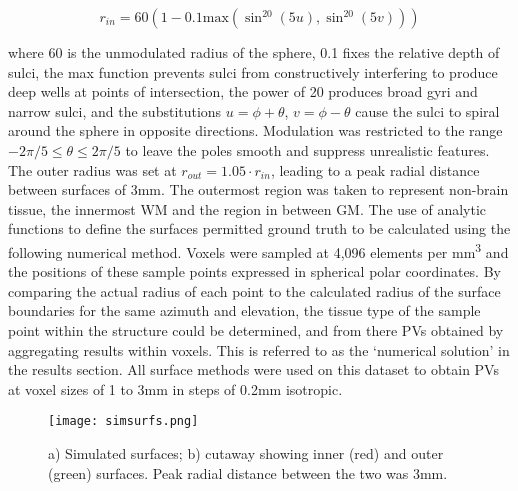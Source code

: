 \begin{equation}
r_{in} = 60 (1 - 0.1 \mathrm{max}(\sin^{20}(5u), \sin^{20}(5v) ) )
\end{equation}

where 60 is the unmodulated radius of the sphere, 0.1 fixes the relative depth of sulci, the max function prevents sulci from constructively interfering to produce deep wells at points of intersection, the power of 20 produces broad gyri and narrow sulci, and the substitutions $u= \phi + \theta$, $v= \phi - \theta$ cause the sulci to spiral around the sphere in opposite directions. Modulation was restricted to the range $-2\pi/5 \leq \theta \leq 2\pi/5$ to leave the poles smooth and suppress unrealistic features. The outer radius was set at $r_{out}= 1.05 \cdot r_{in}$, leading to a peak radial distance between surfaces of 3mm. The outermost region was taken to represent non-brain tissue, the innermost WM and the region in between GM. The use of analytic functions to define the surfaces permitted ground truth to be calculated using the following numerical method. Voxels were sampled at 4,096 elements per mm\textsuperscript{3} and the positions of these sample points expressed in spherical polar coordinates. By comparing the actual radius of each point to the calculated radius of the surface boundaries for the same azimuth and elevation, the tissue type of the sample point within the structure could be determined, and from there PVs obtained by aggregating results within voxels. This is referred to as the ‘numerical solution’ in the results section. All surface methods were used on this dataset to obtain PVs at voxel sizes of 1 to 3mm in steps of 0.2mm isotropic. 

\begin{figure}
\centering
\texttt{[image: simsurfs.png]}
\caption{a) Simulated surfaces; b) cutaway showing inner (red) and outer (green) surfaces. Peak radial distance between the two was 3mm.}
\label{simsurfs}
\end{figure}

